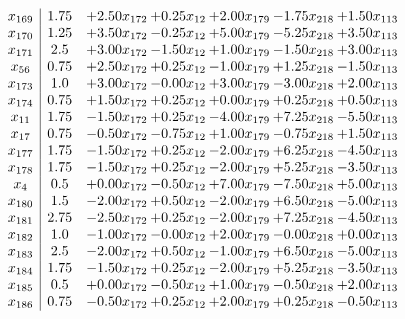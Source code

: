 \documentclass[8pt]{article}
\begin{document}
\[\begin{array}{c| c c@{\hskip 2pt} c@{\hskip 2pt} c@{\hskip 2pt} c@{\hskip 2pt} c@{\hskip 2pt} }
 x_{169}   &  1.75 & +  2.50 x_{172} & +  0.25 x_{12} & +  2.00 x_{179} & -1.75 x_{218} & +  1.50 x_{113}\\
 x_{170}   &  1.25 & +  3.50 x_{172} & -0.25 x_{12} & +  5.00 x_{179} & -5.25 x_{218} & +  3.50 x_{113}\\
 x_{171}   &  2.5 & +  3.00 x_{172} & -1.50 x_{12} & +  1.00 x_{179} & -1.50 x_{218} & +  3.00 x_{113}\\
 x_{56}   &  0.75 & +  2.50 x_{172} & +  0.25 x_{12} & -1.00 x_{179} & +  1.25 x_{218} & -1.50 x_{113}\\
 x_{173}   &  1.0 & +  3.00 x_{172} & -0.00 x_{12} & +  3.00 x_{179} & -3.00 x_{218} & +  2.00 x_{113}\\
 x_{174}   &  0.75 & +  1.50 x_{172} & +  0.25 x_{12} & +  0.00 x_{179} & +  0.25 x_{218} & +  0.50 x_{113}\\
 x_{11}   &  1.75 & -1.50 x_{172} & +  0.25 x_{12} & -4.00 x_{179} & +  7.25 x_{218} & -5.50 x_{113}\\
 x_{17}   &  0.75 & -0.50 x_{172} & -0.75 x_{12} & +  1.00 x_{179} & -0.75 x_{218} & +  1.50 x_{113}\\
 x_{177}   &  1.75 & -1.50 x_{172} & +  0.25 x_{12} & -2.00 x_{179} & +  6.25 x_{218} & -4.50 x_{113}\\
 x_{178}   &  1.75 & -1.50 x_{172} & +  0.25 x_{12} & -2.00 x_{179} & +  5.25 x_{218} & -3.50 x_{113}\\
 x_{4}   &  0.5 & +  0.00 x_{172} & -0.50 x_{12} & +  7.00 x_{179} & -7.50 x_{218} & +  5.00 x_{113}\\
 x_{180}   &  1.5 & -2.00 x_{172} & +  0.50 x_{12} & -2.00 x_{179} & +  6.50 x_{218} & -5.00 x_{113}\\
 x_{181}   &  2.75 & -2.50 x_{172} & +  0.25 x_{12} & -2.00 x_{179} & +  7.25 x_{218} & -4.50 x_{113}\\
 x_{182}   &  1.0 & -1.00 x_{172} & -0.00 x_{12} & +  2.00 x_{179} & -0.00 x_{218} & +  0.00 x_{113}\\
 x_{183}   &  2.5 & -2.00 x_{172} & +  0.50 x_{12} & -1.00 x_{179} & +  6.50 x_{218} & -5.00 x_{113}\\
 x_{184}   &  1.75 & -1.50 x_{172} & +  0.25 x_{12} & -2.00 x_{179} & +  5.25 x_{218} & -3.50 x_{113}\\
 x_{185}   &  0.5 & +  0.00 x_{172} & -0.50 x_{12} & +  1.00 x_{179} & -0.50 x_{218} & +  2.00 x_{113}\\
 x_{186}   &  0.75 & -0.50 x_{172} & +  0.25 x_{12} & +  2.00 x_{179} & +  0.25 x_{218} & -0.50 x_{113}\\

\end{array}\]
\end{document}
